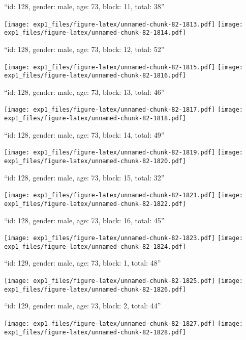 \documentclass[11pt,,]{article}
\begin{document}
\newpage
[1] 

``id: 128, gender: male, age: 73, block: 11, total: 38''

\texttt{[image: exp1\_files/figure-latex/unnamed-chunk-82-1813.pdf]}
\texttt{[image: exp1\_files/figure-latex/unnamed-chunk-82-1814.pdf]}

\newpage
[1] 

``id: 128, gender: male, age: 73, block: 12, total: 52''

\texttt{[image: exp1\_files/figure-latex/unnamed-chunk-82-1815.pdf]}
\texttt{[image: exp1\_files/figure-latex/unnamed-chunk-82-1816.pdf]}

\newpage
[1] 

``id: 128, gender: male, age: 73, block: 13, total: 46''

\texttt{[image: exp1\_files/figure-latex/unnamed-chunk-82-1817.pdf]}
\texttt{[image: exp1\_files/figure-latex/unnamed-chunk-82-1818.pdf]}

\newpage
[1] 

``id: 128, gender: male, age: 73, block: 14, total: 49''

\texttt{[image: exp1\_files/figure-latex/unnamed-chunk-82-1819.pdf]}
\texttt{[image: exp1\_files/figure-latex/unnamed-chunk-82-1820.pdf]}

\newpage
[1] 

``id: 128, gender: male, age: 73, block: 15, total: 32''

\texttt{[image: exp1\_files/figure-latex/unnamed-chunk-82-1821.pdf]}
\texttt{[image: exp1\_files/figure-latex/unnamed-chunk-82-1822.pdf]}

\newpage
[1] 

``id: 128, gender: male, age: 73, block: 16, total: 45''

\texttt{[image: exp1\_files/figure-latex/unnamed-chunk-82-1823.pdf]}
\texttt{[image: exp1\_files/figure-latex/unnamed-chunk-82-1824.pdf]}

\newpage
[1] 

``id: 129, gender: male, age: 73, block: 1, total: 48''

\texttt{[image: exp1\_files/figure-latex/unnamed-chunk-82-1825.pdf]}
\texttt{[image: exp1\_files/figure-latex/unnamed-chunk-82-1826.pdf]}

\newpage
[1] 

``id: 129, gender: male, age: 73, block: 2, total: 44''

\texttt{[image: exp1\_files/figure-latex/unnamed-chunk-82-1827.pdf]}
\texttt{[image: exp1\_files/figure-latex/unnamed-chunk-82-1828.pdf]}
\end{document}
